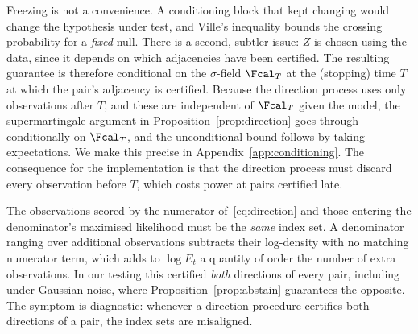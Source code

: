 Freezing is not a convenience. A conditioning block that kept changing would
change the hypothesis under test, and Ville's inequality bounds the crossing
probability for a \emph{fixed} null. There is a second, subtler issue:
$Z$ is chosen using the data, since it depends on which adjacencies have been
certified. The resulting guarantee is therefore conditional on the
$\sigma$-field $\Fcal_T$ at the (stopping) time $T$ at which the pair's
adjacency is certified. Because the direction process uses only observations
after $T$, and these are independent of $\Fcal_T$ given the model, the
supermartingale argument in Proposition~\ref{prop:direction} goes through
conditionally on $\Fcal_T$, and the unconditional bound follows by taking
expectations. We make this precise in Appendix~\ref{app:conditioning}. The
consequence for the implementation is that the direction process must discard
every observation before $T$, which costs power at pairs certified late.

\begin{remark}
\label{rem:samesupport}
The observations scored by the numerator of~\eqref{eq:direction} and those
entering the denominator's maximised likelihood must be the \emph{same} index
set. A denominator ranging over additional observations subtracts their
log-density with no matching numerator term, which adds to $\log E_t$ a
quantity of order the number of extra observations. In our testing this
certified \emph{both} directions of every pair, including under Gaussian
noise, where Proposition~\ref{prop:abstain} guarantees the opposite. The
symptom is diagnostic: whenever a direction procedure certifies both
directions of a pair, the index sets are misaligned.
\end{remark}

